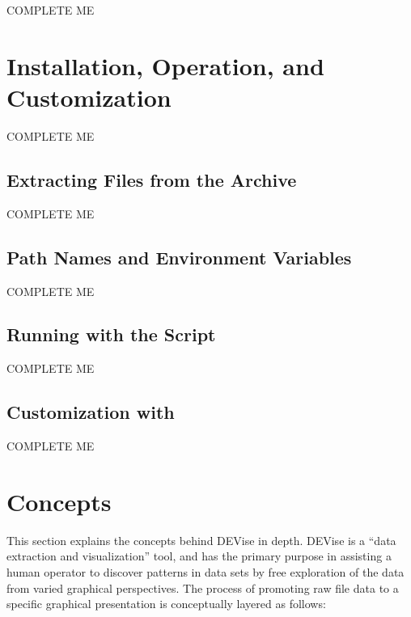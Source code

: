 COMPLETE ME


\section{Installation, Operation, and Customization}

COMPLETE ME

\subsection{Extracting Files from the  Archive}

COMPLETE ME

\subsection{Path Names and Environment Variables}

COMPLETE ME

\subsection{Running with the  Script}

COMPLETE ME

\subsection{Customization with }

COMPLETE ME


\section{Concepts}

This section explains the concepts behind DEVise in depth. DEVise is a ``data
extraction and visualization'' tool, and has the primary purpose in assisting a
human operator to discover patterns in data sets by free exploration of the data
from varied graphical perspectives. The process of promoting raw file data to a
specific graphical presentation is conceptually layered as follows:

